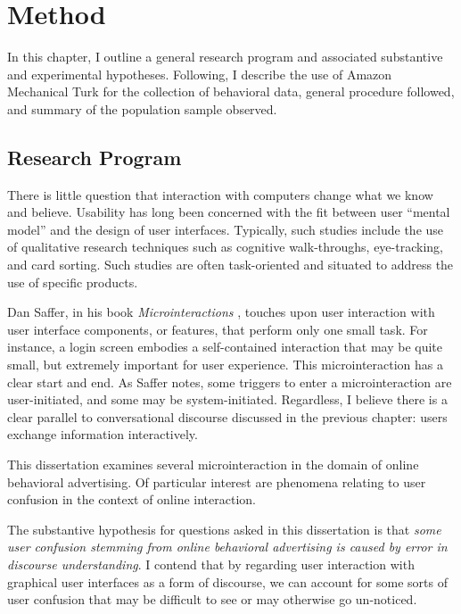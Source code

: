 \chapter{Method}
\label{method}

In this chapter, I outline a general research program and associated substantive and experimental hypotheses. Following, I describe the use of Amazon Mechanical Turk for the collection of behavioral data, general procedure followed, and summary of the population sample observed.

\section{Research Program}
\label{researchprogram}

There is little question that interaction with computers change what we know and believe. Usability has long been concerned with the fit between user ``mental model'' and the design of user interfaces. Typically, such studies include the use of qualitative research techniques such as cognitive walk-throughs, eye-tracking, and card sorting. Such studies are often task-oriented and situated to address the use of specific products.

Dan Saffer, in his book \emph{Microinteractions}  \citeyearpar{Saffer:2013wn},  touches upon user interaction with user interface components, or features, that perform only one small task. For instance, a login screen embodies a self-contained interaction that may be quite small, but extremely important for user experience. This microinteraction has a clear start and end. As Saffer notes, some triggers to enter a microinteraction are user-initiated, and some may be system-initiated. Regardless, I believe there is a clear parallel to conversational discourse discussed in the previous chapter: users exchange information interactively.

This dissertation examines several microinteraction in the domain of online behavioral advertising. Of particular interest are phenomena relating to user confusion in the context of online interaction. 

The substantive hypothesis for questions asked in this dissertation is that \emph{some user confusion stemming from online behavioral advertising is caused by error in discourse understanding}. I contend that by regarding user interaction with graphical user interfaces as a form of discourse, we can account for some sorts of user confusion that may be difficult to see or may otherwise go un-noticed.

